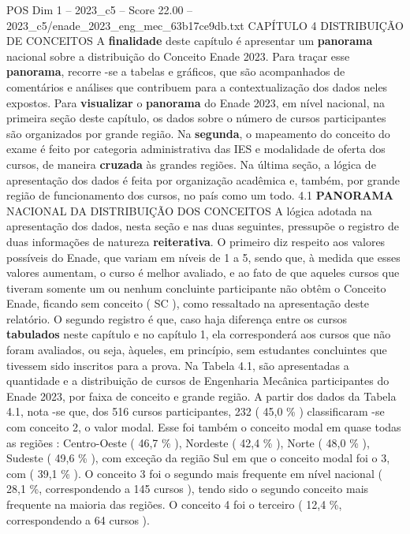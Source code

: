 \begin{textsample}{POS Dim 1 – 2023\_c5 – Score 22.00 – 2023\_c5/enade\_2023\_eng\_mec\_63b17ce9db.txt}  \label{ex:f1_pos_005}
CAPÍTULO 4 DISTRIBUIÇÃO DE CONCEITOS A \textbf{finalidade} deste capítulo é apresentar um \textbf{panorama} nacional sobre a distribuição do Conceito Enade 2023.
Para traçar esse \textbf{panorama}, recorre -se a tabelas e gráficos, que são acompanhados de comentários e análises que contribuem para a contextualização dos dados neles expostos.
Para \textbf{visualizar} o \textbf{panorama} do Enade 2023, em nível nacional, na primeira seção deste capítulo, os dados sobre o número de cursos participantes são organizados por grande região.
Na \textbf{segunda}, o mapeamento do conceito do exame é feito por categoria administrativa das IES e modalidade de oferta dos cursos, de maneira \textbf{cruzada} às grandes regiões.
Na última seção, a lógica de apresentação dos dados é feita por organização acadêmica e, também, por grande região de funcionamento dos cursos, no país como um todo. 4.1 \textbf{PANORAMA} NACIONAL DA DISTRIBUIÇÃO DOS CONCEITOS A lógica adotada na apresentação dos dados, nesta seção e nas duas seguintes, pressupõe o registro de duas informações de natureza \textbf{reiterativa}.
O primeiro diz respeito aos valores possíveis do Enade, que variam em níveis de 1 a 5, sendo que, à medida que esses valores aumentam, o curso é melhor avaliado, e ao fato de que aqueles cursos que tiveram somente um ou nenhum concluinte participante não obtêm o Conceito Enade, ficando sem conceito ( SC ), como ressaltado na apresentação deste relatório.
O segundo registro é que, caso haja diferença entre os cursos \textbf{tabulados} neste capítulo e no capítulo 1, ela corresponderá aos cursos que não foram avaliados, ou seja, àqueles, em princípio, sem estudantes concluintes que tivessem sido inscritos para a prova.
Na Tabela 4.1, são apresentadas a quantidade e a distribuição de cursos de Engenharia Mecânica participantes do Enade 2023, por faixa de conceito e grande região.
A partir dos dados da Tabela 4.1, nota -se que, dos 516 cursos participantes, 232 ( 45,0 \% ) classificaram -se com conceito 2, o valor modal.
Esse foi também o conceito modal em quase todas as regiões : Centro-Oeste ( 46,7 \% ), Nordeste ( 42,4 \% ), Norte ( 48,0 \% ), Sudeste ( 49,6 \% ), com exceção da região Sul em que o conceito modal foi o 3, com ( 39,1 \% ).
O conceito 3 foi o segundo mais frequente em nível nacional ( 28,1 \%, correspondendo a 145 cursos ), tendo sido o segundo conceito mais frequente na maioria das regiões.
O conceito 4 foi o terceiro ( 12,4 \%, correspondendo a 64 cursos ).

\end{textsample}
